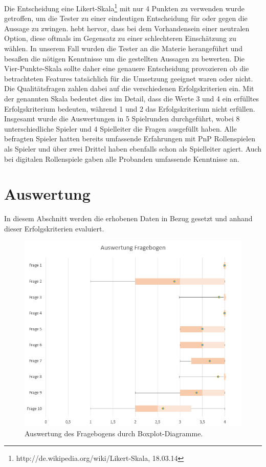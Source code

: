 Die Entscheidung eine Likert-Skala\footnote{http://de.wikipedia.org/wiki/Likert-Skala, 18.03.14} mit nur 4 Punkten zu verwenden wurde getroffen, um die Tester zu einer eindeutigen Entscheidung für oder gegen die Aussage zu zwingen. \cite{Garland1991} hebt hervor, dass bei dem Vorhandensein einer neutralen Option, diese oftmals im Gegensatz zu einer schlechteren Einschätzung zu wählen. In unserem Fall wurden die Tester an die Materie herangeführt und besaßen die nötigen Kenntnisse um die gestellten Aussagen zu bewerten. Die Vier-Punkte-Skala sollte daher eine genauere Entscheidung provozieren ob die betrachteten Features tatsächlich für die Umsetzung geeignet waren oder nicht.
Die Qualitätsfragen zahlen dabei auf die verschiedenen Erfolgskriterien ein. Mit der genannten Skala bedeutet dies im Detail, dass die Werte 3 und 4 ein erfülltes Erfolgskriterium bedeuten, während 1 und 2 das Erfolgskriterium nicht erfüllen. \newline
Insgesamt wurde die Auswertungen in 5 Spielrunden durchgeführt, wobei 8 unterschiedliche Spieler und 4 Spielleiter die Fragen ausgefüllt haben. Alle befragten Spieler hatten bereits umfassende Erfahrungen mit PnP Rollenspielen als Spieler und über zwei Drittel haben ebenfalls schon als Spielleiter agiert. Auch bei digitalen Rollenspiele gaben alle Probanden umfassende Kenntnisse an. 



\section{Auswertung}
\label{sec:Auswertung}

In diesem Abschnitt werden die erhobenen Daten in Bezug gesetzt und anhand dieser Erfolgskriterien evaluiert.

\begin{figure}[h!]
	\centering
		\includegraphics[width=1.00\textwidth]{media/Auswertung.png}
	\caption{Auswertung des Fragebogens durch Boxplot-Diagramme.}
	\label{fig:Auswertung}
\end{figure}



